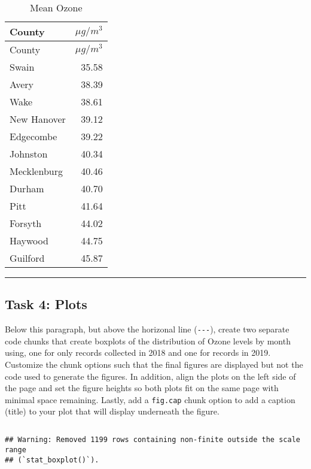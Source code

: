 \documentclass[
]{article}
\begin{document}
\begin{longtable}[]{@{}lr@{}}
\caption{Mean Ozone}\tabularnewline
\toprule\noalign{}
County & \(\mu g/m^3\) \\
\midrule\noalign{}
\endfirsthead
\toprule\noalign{}
County & \(\mu g/m^3\) \\
\midrule\noalign{}
\endhead
\bottomrule\noalign{}
\endlastfoot
Swain & 35.58 \\
Avery & 38.39 \\
Wake & 38.61 \\
New Hanover & 39.12 \\
Edgecombe & 39.22 \\
Johnston & 40.34 \\
Mecklenburg & 40.46 \\
Durham & 40.70 \\
Pitt & 41.64 \\
Forsyth & 44.02 \\
Haywood & 44.75 \\
Guilford & 45.87 \\
\end{longtable}

\begin{center}\rule{0.5\linewidth}{0.5pt}\end{center}

\subsection{Task 4: Plots}\label{task-4-plots}

Below this paragraph, but above the horizonal line (\texttt{-\/-\/-}),
create two separate code chunks that create boxplots of the distribution
of Ozone levels by month using, one for only records collected in 2018
and one for records in 2019. Customize the chunk options such that the
final figures are displayed but not the code used to generate the
figures. In addition, align the plots on the left side of the page and
set the figure heights so both plots fit on the same page with minimal
space remaining. Lastly, add a \texttt{fig.cap} chunk option to add a
caption (title) to your plot that will display underneath the figure.

\subsection{\texorpdfstring{\newpage}{}}\label{section}

\begin{verbatim}
## Warning: Removed 1199 rows containing non-finite outside the scale range
## (`stat_boxplot()`).
\end{verbatim}
\end{document}
